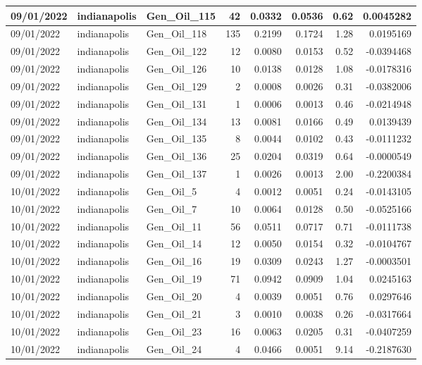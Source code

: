 \documentclass[
  letterpaper,
  DIV=11,
  numbers=noendperiod]{scrartcl}
\begin{document}
\begin{tabular}{l|l|l|r|r|r|r|r}
\hline
09/01/2022 & indianapolis & Gen\_Oil\_115 & 42 & 0.0332 & 0.0536 & 0.62 & 0.0045282\\
\hline
09/01/2022 & indianapolis & Gen\_Oil\_118 & 135 & 0.2199 & 0.1724 & 1.28 & 0.0195169\\
\hline
09/01/2022 & indianapolis & Gen\_Oil\_122 & 12 & 0.0080 & 0.0153 & 0.52 & -0.0394468\\
\hline
09/01/2022 & indianapolis & Gen\_Oil\_126 & 10 & 0.0138 & 0.0128 & 1.08 & -0.0178316\\
\hline
09/01/2022 & indianapolis & Gen\_Oil\_129 & 2 & 0.0008 & 0.0026 & 0.31 & -0.0382006\\
\hline
09/01/2022 & indianapolis & Gen\_Oil\_131 & 1 & 0.0006 & 0.0013 & 0.46 & -0.0214948\\
\hline
09/01/2022 & indianapolis & Gen\_Oil\_134 & 13 & 0.0081 & 0.0166 & 0.49 & 0.0139439\\
\hline
09/01/2022 & indianapolis & Gen\_Oil\_135 & 8 & 0.0044 & 0.0102 & 0.43 & -0.0111232\\
\hline
09/01/2022 & indianapolis & Gen\_Oil\_136 & 25 & 0.0204 & 0.0319 & 0.64 & -0.0000549\\
\hline
09/01/2022 & indianapolis & Gen\_Oil\_137 & 1 & 0.0026 & 0.0013 & 2.00 & -0.2200384\\
\hline
10/01/2022 & indianapolis & Gen\_Oil\_5 & 4 & 0.0012 & 0.0051 & 0.24 & -0.0143105\\
\hline
10/01/2022 & indianapolis & Gen\_Oil\_7 & 10 & 0.0064 & 0.0128 & 0.50 & -0.0525166\\
\hline
10/01/2022 & indianapolis & Gen\_Oil\_11 & 56 & 0.0511 & 0.0717 & 0.71 & -0.0111738\\
\hline
10/01/2022 & indianapolis & Gen\_Oil\_14 & 12 & 0.0050 & 0.0154 & 0.32 & -0.0104767\\
\hline
10/01/2022 & indianapolis & Gen\_Oil\_16 & 19 & 0.0309 & 0.0243 & 1.27 & -0.0003501\\
\hline
10/01/2022 & indianapolis & Gen\_Oil\_19 & 71 & 0.0942 & 0.0909 & 1.04 & 0.0245163\\
\hline
10/01/2022 & indianapolis & Gen\_Oil\_20 & 4 & 0.0039 & 0.0051 & 0.76 & 0.0297646\\
\hline
10/01/2022 & indianapolis & Gen\_Oil\_21 & 3 & 0.0010 & 0.0038 & 0.26 & -0.0317664\\
\hline
10/01/2022 & indianapolis & Gen\_Oil\_23 & 16 & 0.0063 & 0.0205 & 0.31 & -0.0407259\\
\hline
10/01/2022 & indianapolis & Gen\_Oil\_24 & 4 & 0.0466 & 0.0051 & 9.14 & -0.2187630\\

\end{tabular}
\end{document}
